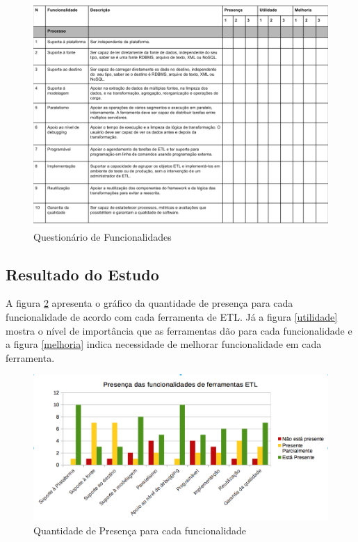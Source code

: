 \begin{figure}[h!]
	\centering
	\includegraphics[scale=0.5]{fig/questionario_caracteristicas.png}
	\caption{Questionário de Funcionalidades}
	\label{questionariofuncionalidades}
\end{figure}

\clearpage

\subsection{Resultado do Estudo}


A figura \ref{presenca} apresenta o gráfico da quantidade de presença para cada funcionalidade de acordo com cada ferramenta de ETL. Já a figura \ref{utilidade} mostra o nível de importância que as ferramentas dão para cada funcionalidade e a figura \ref{melhoria} indica necessidade de melhorar funcionalidade em cada ferramenta.

\begin{figure}[h]
	\centering
	\includegraphics[scale=0.4]{fig/presenca.png}
	\caption{Quantidade de Presença para cada funcionalidade}
	\label{presenca}
\end{figure}

